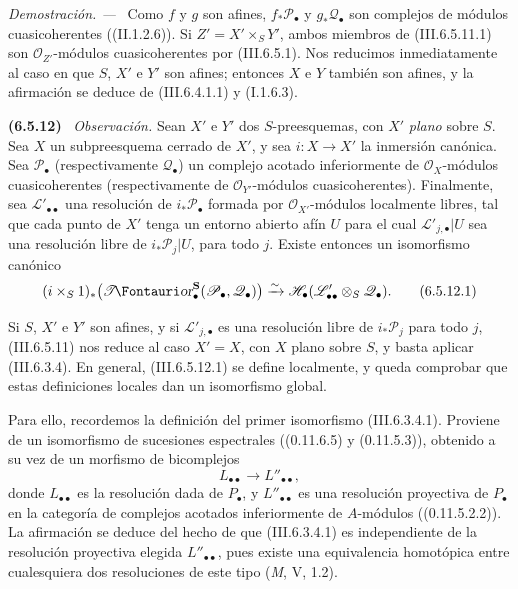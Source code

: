 \documentclass[10pt,oneside]{book}
\makeatletter
\newcommand{\sh}[1]{\mathscr{#1}}
\newcommand*{\ega@sheafop}[3]{\sh{#1}#2\textup{\kern-2.2pt{\Fontauri\slshape #3}}}
\newcommand{\shTor}{\ega@sheafop{T}{}{or}}
\newcommand{\sref}[2][]{\textup{(#2)}}
\newcommand{\oldpage}[2][]{\setcounter{footnote}{0}\marginpar{\scriptsize\textbf{#1}~|~#2}\ignorespaces}
\newenvironment{env}[1][]{\par\medskip\noindent\textbf{(#1)}\ }{\par}
\newenvironment{proof}{\par\medskip\noindent\textit{Demostración. ---\ }}{\par}
\makeatother
\begin{document}
\begin{proof}
Como $f$ y $g$ son afines, $f_*\sh P_\bullet$ y
$g_*\sh Q_\bullet$ son complejos de módulos cuasicoherentes
(\sref[II]{II.1.2.6}). Si $Z'=X'\times_SY'$, ambos miembros de
\sref{III.6.5.11.1} son $\sh O_{Z'}$-módulos cuasicoherentes por
\sref{III.6.5.1}. Nos reducimos inmediatamente al caso en que
$S$, $X'$ e $Y'$ son afines; entonces $X$ e $Y$ también son
afines, y la afirmación se deduce de \sref{III.6.4.1.1} y
\sref[I]{I.1.6.3}.
\end{proof}

\begin{env}[6.5.12]
\label{III.6.5.12}
\emph{Observación.}
Sean $X'$ e $Y'$ dos $S$-preesquemas, con $X'$ \emph{plano} sobre $S$.
Sea $X$ un subpreesquema cerrado de $X'$, y sea
$i:X\to X'$ la inmersión canónica. Sea $\sh P_\bullet$
(respectivamente $\sh Q_\bullet$) un complejo acotado
inferiormente de $\sh O_X$-módulos cuasicoherentes
(respectivamente de $\sh O_{Y'}$-módulos cuasicoherentes).
Finalmente, sea $\sh L'_{\bullet\bullet}$ una resolución de
$i_*\sh P_\bullet$ formada por $\sh O_{X'}$-módulos localmente
libres, tal que cada punto de $X'$ tenga un entorno abierto afín
$U$ para el cual $\sh L'_{j,\bullet}|U$ sea una resolución libre de
$i_*\sh P_j|U$, para todo $j$. Existe entonces un isomorfismo
canónico
\[
  (i\times_S1)_*
  \bigl(\boldsymbol{\shTor}_\bullet^{\mathbf{S}}(\sh P_\bullet,\sh Q_\bullet)\bigr)
  \xrightarrow{\sim}
  \sh H_\bullet(\sh L'_{\bullet\bullet}\otimes_S\sh Q_\bullet).
  \tag{6.5.12.1}\label{III.6.5.12.1}
\]

Si $S$, $X'$ e $Y'$ son afines, y si
$\sh L'_{j,\bullet}$ es una resolución libre de $i_*\sh P_j$ para
todo $j$, \sref{III.6.5.11} nos reduce al caso $X'=X$, con $X$
plano sobre $S$, y basta aplicar \sref{III.6.3.4}. En general,
\sref{III.6.5.12.1} se define localmente, y queda comprobar que
estas definiciones locales dan un isomorfismo global.

Para ello, recordemos la definición del primer isomorfismo
\sref{III.6.3.4.1}. Proviene de un isomorfismo de sucesiones
espectrales (\sref[0]{0.11.6.5} y \sref[0]{0.11.5.3}), obtenido a
su vez de un morfismo de bicomplejos
\[
  L_{\bullet\bullet}\longrightarrow L''_{\bullet\bullet},
\]
donde $L_{\bullet\bullet}$ es la resolución dada de $P_\bullet$,
y $L''_{\bullet\bullet}$ es una resolución proyectiva de
$P_\bullet$ en la categoría de complejos acotados
\oldpage[III]{152}
inferiormente
de $A$-módulos (\sref[0]{0.11.5.2.2}). La afirmación se deduce del
hecho de que \sref{III.6.3.4.1} es independiente de la resolución
proyectiva elegida $L''_{\bullet\bullet}$, pues existe una equivalencia
homotópica entre cualesquiera dos resoluciones de este tipo
(\emph{M}, V, 1.2).
\end{env}
\end{document}
